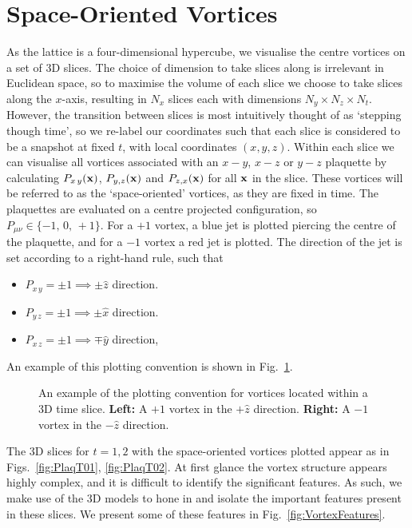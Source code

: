 \section{Space-Oriented Vortices}
As the lattice is a four-dimensional hypercube, we visualise the centre vortices on a set of 3D slices. The choice of dimension to take slices along is irrelevant in Euclidean space, so to maximise the volume of each slice we choose to take slices along the $x$-axis, resulting in $N_x$ slices each with dimensions $N_y\times N_z\times N_t$. However, the transition between slices is most intuitively thought of as `stepping though time', so we re-label our coordinates such that each slice is considered to be a snapshot at fixed $t$, with local coordinates $(x,y,z)$. Within each slice we can visualise all vortices associated with an $x-y$, $x-z$ or $y-z$ plaquette by calculating $P_{x\,y}(\bf{x})$, $P_{y,z}(\bf{x})$ and $P_{z,x}(\bf{x})$ for all $\bf{x}$ in the slice. These vortices will be referred to as the `space-oriented' vortices, as they are fixed in time. The plaquettes are evaluated on a centre projected configuration, so $P_{\mu\nu}\in \lbrace -1,\,0,\,+1\rbrace$. For a $+1$ vortex, a blue jet is plotted piercing the centre of the plaquette, and for a $-1$ vortex a red jet is plotted. The direction of the jet is set according to a right-hand rule, such that
\begin{itemize}[leftmargin=*,itemsep=0pt,labelsep=12pt]
\item $P_{x\,y}=\pm 1\implies \pm\hat{z}$ direction.
\item $P_{y\,z}=\pm 1\implies \pm\hat{x}$ direction.
\item $P_{x\,z}=\pm 1\implies \mp\hat{y}$ direction,
\end{itemize}
An example of this plotting convention is shown in Fig.~\ref{fig:SpacialVortices}.\\
%
\begin{figure}[ht]
\centering
\scalebox{0.95}{}     
\caption[An example of the plotting convention for vortices located within a 3D time slice.]{\label{fig:SpacialVortices}An example of the plotting convention for vortices located within a 3D time slice. \textbf{Left:} A $+1$ vortex in the $+\hat{z}$ direction. \textbf{Right:} A $-1$ vortex in the $-\hat{z}$ direction.}
\end{figure}
%

The 3D slices for $t=1,2$ with the space-oriented vortices plotted appear as in Figs.~\ref{fig:PlaqT01}, \ref{fig:PlaqT02}. At first glance the vortex structure appears highly complex, and it is difficult to identify the significant features. As such, we make use of the 3D models to hone in and isolate the important features present in these slices. We present some of these features in Fig.~\ref{fig:VortexFeatures}.\\

